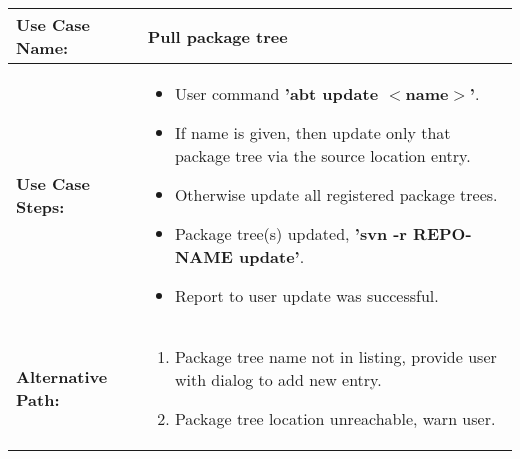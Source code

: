 \medskip

\begin{tabularx}{\linewidth}{|l|X|}
\hline
\textbf{Use Case Name:} & \textbf{Pull package tree} \\
\hline
\textbf{Use Case Steps:} & 
\begin{minipage}{\linewidth} 
  \vspace{0.05em}
  \begin{itemize}
    \item User command \textbf{'abt update $<$name$>$'}.
    \item If name is given, then update only that package tree via the source location entry.
    \item Otherwise update all registered package trees.
    \item Package tree(s) updated, \textbf{'svn -r REPO-NAME update'}.
    \item Report to user update was successful.
  \end{itemize}
  \vspace{0.05em}
\end{minipage}
\\
\hline 
\textbf{Alternative Path:} &
\begin{minipage}{\linewidth}
  \vspace{0.05em} 
  \begin{enumerate}
    \item Package tree name not in listing, provide user with dialog to add new entry.
    \item Package tree location unreachable, warn user.
  \end{enumerate}
  \vspace{0.05em} 
\end{minipage}
\\
\hline
\end{tabularx}